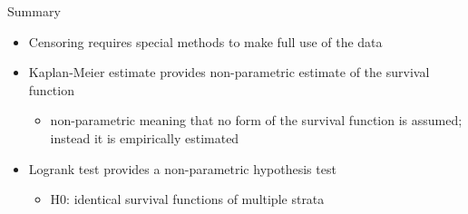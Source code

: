 \documentclass[
  ignorenonframetext,
]{beamer}
\providecommand{\tightlist}{%
  \setlength{\itemsep}{0pt}\setlength{\parskip}{0pt}}
\begin{document}
\begin{frame}{Summary}
\protect\hypertarget{summary}{}

\begin{itemize}
\tightlist
\item
  Censoring requires special methods to make full use of the data
\item
  Kaplan-Meier estimate provides non-parametric estimate of the survival
  function

  \begin{itemize}
  \tightlist
  \item
    non-parametric meaning that no form of the survival function is
    assumed; instead it is empirically estimated
  \end{itemize}
\item
  Logrank test provides a non-parametric hypothesis test

  \begin{itemize}
  \tightlist
  \item
    H0: identical survival functions of multiple strata
  \end{itemize}
\end{itemize}

\end{frame}
\end{document}

